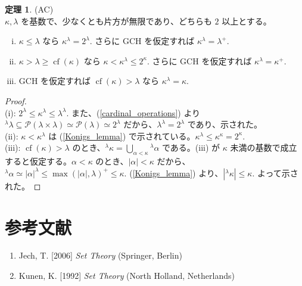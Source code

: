 \documentclass{jsarticle}
\theoremstyle{definition}
\newtheorem{theorem}{定理}[section]
\begin{document}
    \begin{theorem} \label{cardinal_power} (AC)\\
        $\kappa, \lambda$ を基数で、少なくとも片方が無限であり、どちらも $2$ 以上とする。
        \begin{enumerate}[(i)]
            \item $\kappa \leq \lambda$ なら $\kappa^\lambda = 2^\lambda.$ さらに GCH を仮定すれば $\kappa^\lambda = \lambda^+.$
            \item $\kappa > \lambda \geq \operatorname{cf}(\kappa)$ なら $\kappa < \kappa^\lambda \leq 2^\kappa.$ さらに GCH を仮定すれば $\kappa^\lambda = \kappa^+.$
            \item GCH を仮定すれば $\operatorname{cf}(\kappa) > \lambda$ なら $\kappa^\lambda = \kappa.$
        \end{enumerate}
    \end{theorem}
    \begin{proof} \ \\
        (i): $2^\lambda \leq \kappa^\lambda \leq \lambda^\lambda.$ また、(\ref{cardinal_operations}) より $^\lambda\lambda \subseteq \mathcal{P}(\lambda \times \lambda) \simeq \mathcal{P}(\lambda) \simeq 2^\lambda$ だから、$\lambda^\lambda = 2^\lambda$ であり、示された。\\
        (ii): $\kappa < \kappa^\lambda$ は (\ref{Konigs_lemma}) で示されている。$\kappa^\lambda \leq \kappa^\kappa = 2^\kappa.$\\
        (iii): $\operatorname{cf}(\kappa) > \lambda$ のとき、$\displaystyle ^\lambda \kappa = \bigcup_{\alpha < \kappa} {^\lambda \alpha}$ である。(iii) が $\kappa$ 未満の基数で成立すると仮定する。$\alpha < \kappa$ のとき、$|\alpha| < \kappa$ だから、$^\lambda\alpha \simeq |\alpha|^\lambda \leq \max(|\alpha|, \lambda)^+ \leq \kappa.$ (\ref{Konigs_lemma}) より、$|{^\lambda \kappa}| \leq \kappa.$ よって示された。
    \end{proof}
    
    \section{参考文献}
    \begin{enumerate}[]
        \item Jech, T. [2006] {\it Set Theory} (Springer, Berlin)
        \item Kunen, K. [1992] {\it Set Theory} (North Holland, Netherlands)
    \end{enumerate}
\end{document}
